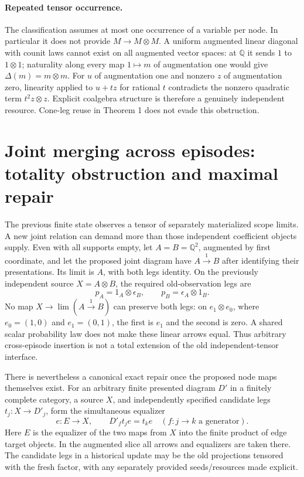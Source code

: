 \documentclass[11pt]{article}
\begin{document}
\paragraph{Repeated tensor occurrence.}
The classification assumes at most one occurrence of a variable per node. In particular it does not provide $M\to M\otimes M$. A uniform augmented linear diagonal with counit laws cannot exist on all augmented vector spaces: at $\mathbb Q$ it sends $1$ to $1\otimes1$; naturality along every map $1\mapsto m$ of augmentation one would give $\Delta(m)=m\otimes m$. For $u$ of augmentation one and nonzero $z$ of augmentation zero, linearity applied to $u+t z$ for rational $t$ contradicts the nonzero quadratic term $t^2z\otimes z$. Explicit coalgebra structure is therefore a genuinely independent resource. Cone-leg reuse in Theorem 1 does not evade this obstruction.

\section{Joint merging across episodes: totality obstruction and maximal repair}
The previous finite state observes a tensor of separately materialized scope limits. A new joint relation can demand more than those independent coefficient objects supply. Even with all supports empty, let $A=B=\mathbb Q^2$, augmented by first coordinate, and let the proposed joint diagram have $A\xrightarrow{1}B$ after identifying their presentations. Its limit is $A$, with both legs identity. On the previously independent source $X=A\otimes B$, the required old-observation legs are
\[
 p_A=1_A\otimes\epsilon_B,\qquad p_B=\epsilon_A\otimes1_B.
\]
No map $X\to\lim(A\xrightarrow1B)$ can preserve both legs: on $e_1\otimes e_0$, where $e_0=(1,0)$ and $e_1=(0,1)$, the first is $e_1$ and the second is zero. A shared scalar probability law does not make these linear arrows equal. Thus arbitrary cross-episode insertion is not a total extension of the old independent-tensor interface.

There is nevertheless a canonical exact repair once the proposed node maps themselves exist. For an arbitrary finite presented diagram $D'$ in a finitely complete category, a source $X$, and independently specified candidate legs $t_j:X\to D'_j$, form the simultaneous equalizer
\[
 e:E\longrightarrow X,\qquad
 D'_f t_j e=t_k e\quad(f:j\to k\text{ a generator}).\tag{4}
\]
Here $E$ is the equalizer of the two maps from $X$ into the finite product of edge target objects. In the augmented slice all arrows and equalizers are taken there. The candidate legs in a historical update may be the old projections tensored with the fresh factor, with any separately provided seeds/resources made explicit.
\end{document}
